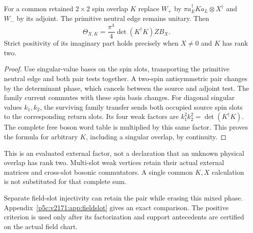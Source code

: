 \documentclass[12pt,a4paper]{article}
\begin{document}
\begin{corollary}
\label{p5c:v2171:cor:spinoverlap}
For a common retained $2\times2$ spin overlap $K$ replace $W_+$ by
$\pi a_E^\dagger K a_L\otimes X^\dagger$ and $W_-$ by its adjoint.
The primitive neutral edge remains unitary. Then
\begin{equation}
 \boxed{\Theta_{X,K}=\frac{\pi^4}{4}\det(K^\dagger K)ZB_X.}
 \label{p5c:v2171:eq:spinoverlap}
\end{equation}
Strict positivity of its imaginary part holds precisely when $X\ne0$
and $K$ has rank two.
\end{corollary}
\begin{proof}
Use singular-value bases on the spin slots, transporting the primitive
neutral edge and both pair tests together. A two-spin antisymmetric pair
changes by the determinant phase, which cancels between the source and
adjoint test. The family current commutes with these spin basis changes.
For diagonal singular values $k_1,k_2$, the surviving family transfer sends
both occupied source spin slots to the corresponding return slots. Its
four weak factors are $k_1^2k_2^2=\det(K^\dagger K)$. The complete free
boson word table is multiplied by this same factor. This proves the formula
for arbitrary $K$, including a singular overlap, by continuity.
\end{proof}
This is an evaluated external factor, not a declaration that an unknown
physical overlap has rank two. Multi-slot weak vertices retain their actual
external matrices and cross-slot bosonic commutators. A single common $K,X$
calculation is not substituted for that complete sum.


Separate field-slot injectivity can retain the pair while erasing this
mixed phase. Appendix~\ref{p5c:v2171:app:fieldslot} gives an exact comparison.
The positive criterion is used only after its factorization and support
antecedents are certified on the actual field chart.



\end{document}
